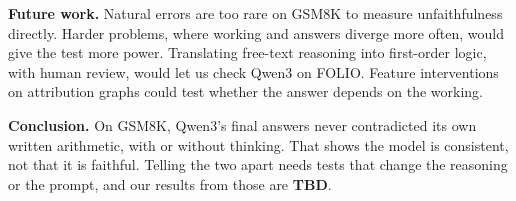 \textbf{Future work.} Natural errors are too rare on GSM8K to measure unfaithfulness
directly. Harder problems, where working and answers diverge more often, would give
the test more power. Translating free-text reasoning into first-order logic, with
human review, would let us check Qwen3 on FOLIO. Feature interventions on attribution
graphs could test whether the answer depends on the working.

\textbf{Conclusion.} On GSM8K, Qwen3's final answers never contradicted its own
written arithmetic, with or without thinking. That shows the model is consistent, not
that it is faithful. Telling the two apart needs tests that change the reasoning or
the prompt, and our results from those are \textbf{TBD}.
